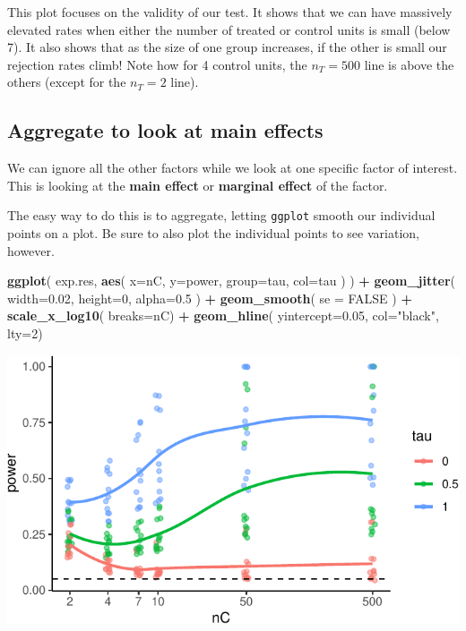 \documentclass[
]{book}
\newenvironment{Shaded}{\begin{snugshade}}{\end{snugshade}}
\newcommand{\AttributeTok}[1]{\textcolor[rgb]{0.13,0.29,0.53}{#1}}
\newcommand{\ConstantTok}[1]{\textcolor[rgb]{0.56,0.35,0.01}{#1}}
\newcommand{\DecValTok}[1]{\textcolor[rgb]{0.00,0.00,0.81}{#1}}
\newcommand{\FloatTok}[1]{\textcolor[rgb]{0.00,0.00,0.81}{#1}}
\newcommand{\FunctionTok}[1]{\textcolor[rgb]{0.13,0.29,0.53}{\textbf{#1}}}
\newcommand{\NormalTok}[1]{#1}
\newcommand{\SpecialCharTok}[1]{\textcolor[rgb]{0.81,0.36,0.00}{\textbf{#1}}}
\newcommand{\StringTok}[1]{\textcolor[rgb]{0.31,0.60,0.02}{#1}}
\begin{document}
This plot focuses on the validity of our test.
It shows that we can have massively elevated rates when either the number of treated or control units is small (below 7).
It also shows that as the size of one group increases, if the other is small our rejection rates climb! Note how for 4 control units, the \(n_T = 500\) line is above the others (except for the \(n_T = 2\) line).

\subsection{Aggregate to look at main effects}\label{aggregate-to-look-at-main-effects}

We can ignore all the other factors while we look at one specific factor of interest.
This is looking at the \textbf{main effect} or \textbf{marginal effect} of the factor.

The easy way to do this is to aggregate, letting \texttt{ggplot} smooth our individual points on a
plot.
Be sure to also plot the individual points to see variation, however.

\begin{Shaded}
\begin{Highlighting}[]
\FunctionTok{ggplot}\NormalTok{( exp.res, }\FunctionTok{aes}\NormalTok{( }\AttributeTok{x=}\NormalTok{nC, }\AttributeTok{y=}\NormalTok{power, }\AttributeTok{group=}\NormalTok{tau, }\AttributeTok{col=}\NormalTok{tau ) ) }\SpecialCharTok{+}
  \FunctionTok{geom\_jitter}\NormalTok{( }\AttributeTok{width=}\FloatTok{0.02}\NormalTok{, }\AttributeTok{height=}\DecValTok{0}\NormalTok{, }\AttributeTok{alpha=}\FloatTok{0.5}\NormalTok{ ) }\SpecialCharTok{+}
  \FunctionTok{geom\_smooth}\NormalTok{( }\AttributeTok{se =} \ConstantTok{FALSE}\NormalTok{ ) }\SpecialCharTok{+}
  \FunctionTok{scale\_x\_log10}\NormalTok{( }\AttributeTok{breaks=}\NormalTok{nC) }\SpecialCharTok{+}
  \FunctionTok{geom\_hline}\NormalTok{( }\AttributeTok{yintercept=}\FloatTok{0.05}\NormalTok{, }\AttributeTok{col=}\StringTok{"black"}\NormalTok{, }\AttributeTok{lty=}\DecValTok{2}\NormalTok{)}
\end{Highlighting}
\end{Shaded}

\begin{center}\includegraphics[width=0.75\linewidth]{Designing-Simulations-in-R_files/figure-latex/plotPool-1} \end{center}
\end{document}
